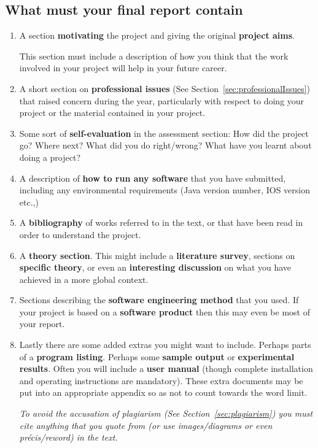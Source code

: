 \documentclass[11pt]{article}
\begin{document}
\subsection{What \textbf{must} your final report contain}
\begin{enumerate}
\item
A section \textbf{motivating} the project and giving the original \textbf{project aims}.

This section must include a description of how you think that the work involved in your project will help in your future career.

\item A short section on \textbf{professional issues} (See Section~\ref{sec:professionalIssues}) that raised concern during the year, particularly with respect to doing your project or the material contained in your project.

\item Some sort of \textbf{self-evaluation} in the assessment section:  How did the project go? Where next? What did you do right/wrong?  What have you learnt about doing a project?

\item A description of \textbf{how to run any software} that you have submitted, including any environmental requirements (Java version number, IOS version etc.,)

\item A \textbf{bibliography} of works referred to in the text, or that have been read in order to understand the project.

\item A {\bf theory section}.  This might include a {\bf literature survey}, sections on {\bf specific theory}, or even an {\bf interesting discussion} on what you have achieved in a more global context.

\item  Sections describing the {\bf software engineering method} that you used.  If your project is  based on a {\bf software product} then this may even be most of your report.

\item Lastly there are some added extras you might want to include. Perhaps parts of a {\bf program listing}.  Perhaps some {\bf sample output} or {\bf experimental results}.  Often you will include a {\bf user manual} (though complete installation and operating instructions are mandatory).  These extra documents may be put into an appropriate appendix so as not to count towards the word limit.

\emph{To avoid the accusation of plagiarism (See Section~\ref{sec:plagiarism})  you must cite anything that you quote from (or use images/diagrams or even pr\'ecis/reword) in the text.}

\end{enumerate}
\end{document}
